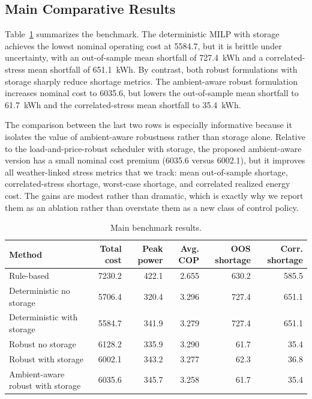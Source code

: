 \subsection{Main Comparative Results}

Table~\ref{tab:main_results} summarizes the benchmark. The deterministic MILP with storage achieves the lowest nominal operating cost at 5584.7, but it is brittle under uncertainty, with an out-of-sample mean shortfall of 727.4~kWh and a correlated-stress mean shortfall of 651.1~kWh. By contrast, both robust formulations with storage sharply reduce shortage metrics. The ambient-aware robust formulation increases nominal cost to 6035.6, but lowers the out-of-sample mean shortfall to 61.7~kWh and the correlated-stress mean shortfall to 35.4~kWh.

The comparison between the last two rows is especially informative because it isolates the value of ambient-aware robustness rather than storage alone. Relative to the load-and-price-robust scheduler with storage, the proposed ambient-aware version has a small nominal cost premium (6035.6 versus 6002.1), but it improves all weather-linked stress metrics that we track: mean out-of-sample shortage, correlated-stress shortage, worst-case shortage, and correlated realized energy cost. The gains are modest rather than dramatic, which is exactly why we report them as an ablation rather than overstate them as a new class of control policy.

\begin{table}[H]
\centering
\caption{Main benchmark results.}
\label{tab:main_results}
\begin{tabular}{lrrrrr}
\toprule
Method & Total cost & Peak power & Avg. COP & OOS shortage & Corr. shortage \\
\midrule
Rule-based & 7230.2 & 422.1 & 2.655 & 630.2 & 585.5 \\
Deterministic no storage & 5706.4 & 320.4 & 3.296 & 727.4 & 651.1 \\
Deterministic with storage & 5584.7 & 341.9 & 3.279 & 727.4 & 651.1 \\
Robust no storage & 6128.2 & 335.9 & 3.290 & 61.7 & 35.4 \\
Robust with storage & 6002.1 & 343.2 & 3.277 & 62.3 & 36.8 \\
Ambient-aware robust with storage & 6035.6 & 345.7 & 3.258 & 61.7 & 35.4 \\
\bottomrule
\end{tabular}
\end{table}

